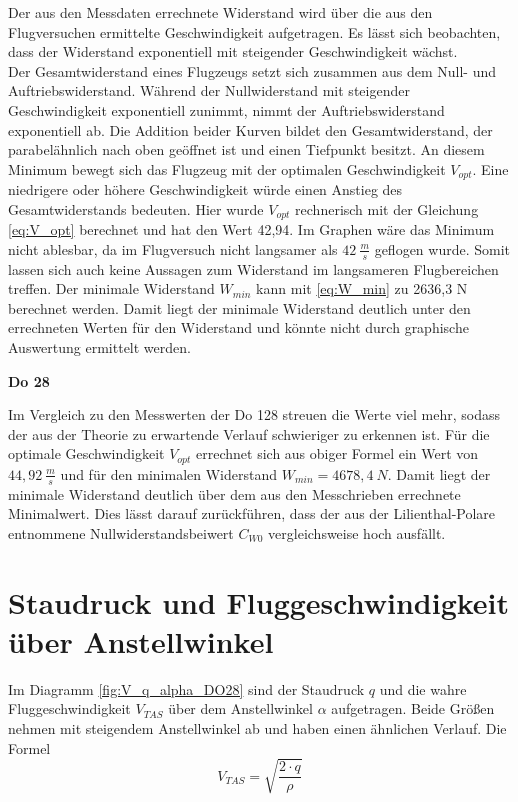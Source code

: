Der aus den Messdaten errechnete Widerstand wird über die aus den Flugversuchen ermittelte Geschwindigkeit aufgetragen. Es lässt sich beobachten, dass der Widerstand exponentiell mit steigender Geschwindigkeit wächst. \\
Der Gesamtwiderstand eines Flugzeugs setzt sich zusammen aus dem Null- und Auftriebswiderstand. Während der Nullwiderstand mit steigender Geschwindigkeit exponentiell zunimmt, nimmt der Auftriebswiderstand exponentiell ab. Die Addition beider Kurven bildet den Gesamtwiderstand, der parabelähnlich nach oben geöffnet ist und einen Tiefpunkt besitzt. An diesem Minimum bewegt sich das Flugzeug mit der optimalen Geschwindigkeit $V_{opt}$. Eine niedrigere oder höhere Geschwindigkeit würde einen Anstieg des Gesamtwiderstands bedeuten. Hier wurde $V_{opt}$ rechnerisch mit der Gleichung \ref{eq:V_opt} berechnet und hat den Wert 42,94. Im Graphen wäre das Minimum nicht ablesbar, da im Flugversuch nicht langsamer als $42 \ \frac{m}{s}$ geflogen wurde. Somit lassen sich auch keine Aussagen zum Widerstand im langsameren Flugbereichen treffen. Der minimale Widerstand $W_{min}$ kann mit \ref{eq:W_min} zu 2636,3 N berechnet werden. Damit liegt der minimale Widerstand deutlich unter den errechneten Werten für den Widerstand und könnte nicht durch graphische Auswertung ermittelt werden.

\textbf{Do 28}

Im Vergleich zu den Messwerten der Do 128 streuen die Werte viel mehr, sodass der aus der Theorie zu erwartende Verlauf schwieriger zu erkennen ist. Für die optimale Geschwindigkeit $V_{opt}$ errechnet sich aus obiger Formel ein Wert von $44,92 \ \frac{m}{s}$ und für den minimalen Widerstand $W_{min}=4678,4 \ N$. Damit liegt der minimale Widerstand deutlich über dem aus den Messchrieben errechnete Minimalwert. Dies lässt darauf zurückführen, dass der aus der Lilienthal-Polare entnommene Nullwiderstandsbeiwert $C_{W0}$ vergleichsweise hoch ausfällt. 


\section{Staudruck und Fluggeschwindigkeit über Anstellwinkel}
Im  Diagramm \ref{fig:V_q_alpha_DO28} sind der Staudruck $q$ und die wahre Fluggeschwindigkeit $V_{TAS}$ über dem Anstellwinkel $\alpha$ aufgetragen. Beide Größen nehmen mit steigendem Anstellwinkel ab und haben einen ähnlichen Verlauf. Die Formel 
\begin{equation}
V_{TAS}=\sqrt{\frac{2 \cdot q}{\rho}}
\end{equation}

